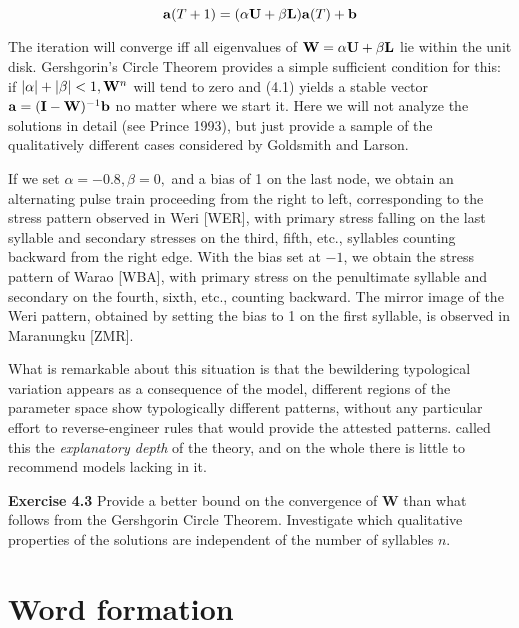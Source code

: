 \begin{equation}
{\bf a}(T+1) =(\alpha {\bf U} + \beta {\bf L}){\bf a}(T)+{\bf b}
\end{equation}  

\smallskip
\noindent 
The iteration will converge iff all eigenvalues of ${\bf W} = \alpha {\bf U} +
\beta {\bf L}$ lie within the unit disk. Gershgorin's Circle Theorem provides
a simple sufficient condition for this: if $|\alpha|+|\beta| < 1, {\bf W}^n$
will tend to zero and (4.1) yields a stable vector ${\bf a} = ({\bf I} - {\bf
  W})^{-1}{\bf b}$ no matter where we start it. Here we will not analyze the
solutions in detail (see Prince 1993),\nocite{Prince:1993a} but just provide a
sample of the qualitatively different cases considered by Goldsmith and
Larson.

If we set $\alpha=-0.8, \beta=0,$ and a bias of 1 on the last node, we obtain
an alternating pulse train proceeding from the right to left, corresponding to
the stress pattern observed in Weri [WER], with primary stress falling on the
last syllable and secondary stresses on the third, fifth, etc., syllables
counting backward from the right edge.   With the bias set
at $-1$, we obtain the stress pattern of Warao [WBA], with primary stress on
the penultimate syllable and secondary on the fourth, sixth, etc., counting
backward. The mirror image of the Weri pattern, obtained by setting the bias
to 1 on the first syllable, is observed in Maranungku [ZMR].

What is remarkable about this situation is that the bewildering typological
variation appears as a consequence of the model, different regions of the
parameter space show typologically different patterns, without any particular
effort to reverse-engineer rules that would provide the attested patterns.
 called this the {\it explanatory depth} of the theory,
and on the whole there is little to recommend models lacking in it. 

\smallskip
\noindent
{\bf Exercise 4.3} Provide a better bound on the convergence of {\bf W} than
what follows from the Gershgorin Circle Theorem. Investigate which qualitative
properties of the solutions are independent of the number of syllables $n$. 

\section{Word formation}


